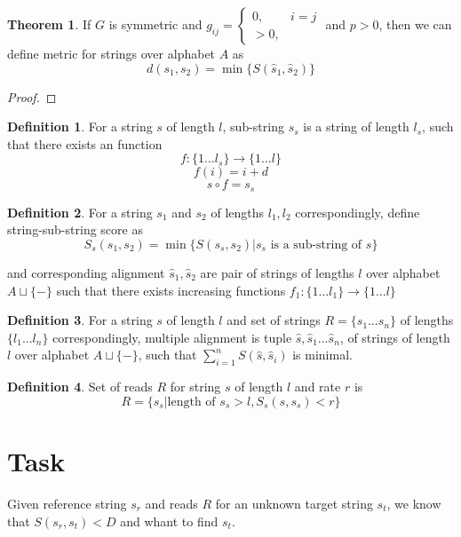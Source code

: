 \documentclass[a4paper, 12pt]{article}
\theoremstyle{definition}
\newtheorem{definition}{Definition}[section]
\theoremstyle{definition}
\newtheorem{theorem}{Theorem}
\theoremstyle{remark}
\begin{document}
\begin{theorem}
    If $G$ is symmetric and 
    $
    g_{ij} =
        \left\{\begin{array}{cc}
        0, & i = j\\
        >0, & 
        \end{array}\right.
    $ and $p > 0$, then we can define metric for strings over alphabet $A$ as 
    $$ d(s_1, s_2) = \min \{S(\hat{s}_1, \hat{s}_2)\}$$ 
\end{theorem}

\begin{proof}
    
\end{proof}

\begin{definition}
    For a string $s$ of length $l$, sub-string $s_s$ 
    is a string of length $l_s$, such that there exists an function
    $$f: \{ 1 \ldots l_s \} \rightarrow \{ 1 \ldots l\}$$
    $$f(i) = i + d $$
    $$s \circ f = s_s $$
\end{definition}

\begin{definition}
    For a string $s_1$ and $s_2$ of lengths $l_1, l_2$ correspondingly, define string-sub-string score as 
    $$ S_s (s_1, s_2) = \min \{ S(s_s, s_2) | s_s \text{ is a sub-string of } s \}$$

    and corresponding alignment $\hat{s}_1, \hat{s}_2$ 
    are pair of strings of lengths $l$ over alphabet $A \sqcup \{ - \}$
    such that there exists increasing functions 
    $f_1: \{1 \ldots l_1 \} \rightarrow \{ 1 \ldots l\}$
\end{definition}

\begin{definition}
    For a string $s$ of length $l$ and set of strings $R = \{ s_1 \ldots s_n \}$ 
    of lengths $\{ l_1 \ldots l_n \}$ correspondingly, 
    multiple alignment is tuple $\hat{s}, \hat{s}_1 \ldots \hat{s}_n$, 
    of strings of length $l$ over alphabet $A \sqcup \{ - \}$, such that $\sum_{i = 1}^n S(\hat{s}, \hat{s}_i)$ is minimal.
\end{definition}

\begin{definition}
    Set of reads $R$ for string $s$ of length $l$ and rate $r$ is 
    $$ R = \{ s_s | \text{length of } s_s > l, S_s(s, s_s) < r \}$$
\end{definition}

\section{Task}
Given reference string $s_r$ and reads $R$ for an unknown target string $s_t$, 
we know that $S(s_r, s_t) < D$ and whant to find $s_t$. \\
\end{document}
